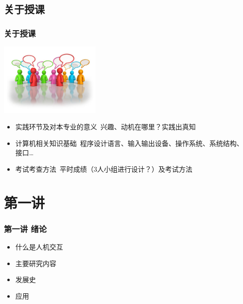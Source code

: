 \documentclass{beamer}
\begin{document}
\subsection{关于授课}
\begin{frame}
	\frametitle{关于授课}
	\begin{center}
		\includegraphics[width=5cm]{images/DiscussionForum.jpg}
	\end{center}
	\beamertemplatetransparentcovereddynamicmedium
	\begin{itemize}[<+->]
		\item 实践环节及对本专业的意义~{\tiny 兴趣、动机在哪里？实践出真知}
		\item 计算机相关知识基础~{\tiny 程序设计语言、输入输出设备、操作系统、系统结构、接口\dots}
		\item 考试考查方法~{\tiny 平时成绩（3人小组进行设计？）及考试方法}
	\end{itemize}
\end{frame}

\section{第一讲}
\begin{frame}
	\frametitle{第一讲 绪论}
	\begin{itemize}
		\item 什么是人机交互
		\item 主要研究内容
		\item 发展史
		\item 应用
	\end{itemize}
\end{frame}
\end{document}
